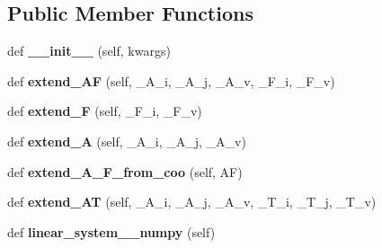 \subsection*{Public Member Functions}
\begin{DoxyCompactItemize}
\item 
\mbox{\label{classpy_p_l_a_n_e_s_1_1classes_1_1model_1_1_model_af058d898b31594bb77c79503a03e14d4}} 
def {\bfseries \+\_\+\+\_\+init\+\_\+\+\_\+} (self, kwargs)
\item 
\mbox{\label{classpy_p_l_a_n_e_s_1_1classes_1_1model_1_1_model_a9c95d1e15f792b3d3add5941f9afa417}} 
def {\bfseries extend\+\_\+\+AF} (self, \+\_\+\+A\+\_\+i, \+\_\+\+A\+\_\+j, \+\_\+\+A\+\_\+v, \+\_\+\+F\+\_\+i, \+\_\+\+F\+\_\+v)
\item 
\mbox{\label{classpy_p_l_a_n_e_s_1_1classes_1_1model_1_1_model_a60d16f0a4f3cc09662bcdbe01dafc682}} 
def {\bfseries extend\+\_\+F} (self, \+\_\+\+F\+\_\+i, \+\_\+\+F\+\_\+v)
\item 
\mbox{\label{classpy_p_l_a_n_e_s_1_1classes_1_1model_1_1_model_ab69f59761ed14ab310c70dac7866e974}} 
def {\bfseries extend\+\_\+A} (self, \+\_\+\+A\+\_\+i, \+\_\+\+A\+\_\+j, \+\_\+\+A\+\_\+v)
\item 
\mbox{\label{classpy_p_l_a_n_e_s_1_1classes_1_1model_1_1_model_a0eb2e6f6b6cddfbc5c455def5d5cf0e2}} 
def {\bfseries extend\+\_\+\+A\+\_\+\+F\+\_\+from\+\_\+coo} (self, AF)
\item 
\mbox{\label{classpy_p_l_a_n_e_s_1_1classes_1_1model_1_1_model_ad11afe301f5f718b4f746da4b778eca8}} 
def {\bfseries extend\+\_\+\+AT} (self, \+\_\+\+A\+\_\+i, \+\_\+\+A\+\_\+j, \+\_\+\+A\+\_\+v, \+\_\+\+T\+\_\+i, \+\_\+\+T\+\_\+j, \+\_\+\+T\+\_\+v)
\item 
\mbox{\label{classpy_p_l_a_n_e_s_1_1classes_1_1model_1_1_model_a912097bb9b8a184432168b4fcfa03e11}} 
def {\bfseries linear\+\_\+system\+\_\+\_\+numpy} (self)

\end{DoxyCompactItemize}
